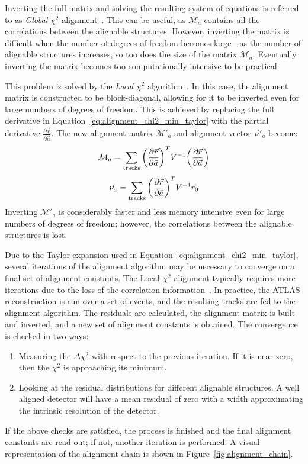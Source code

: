 Inverting the full matrix and solving the resulting system of equations is referred to as \emph{Global} $\chi^2$ alignment~\cite{2005.global-chi2-alignment}.
This can be useful, as $\mathcal{M}_a$ contains all the correlations between the alignable structures.
However, inverting the matrix is difficult when the number of degrees of freedom becomes large---as the number of alignable structures increases, so too does the size of the matrix $\mathcal{M}_a$.
Eventually inverting the matrix becomes too computationally intensive to be practical.

This problem is solved by the \emph{Local} $\chi^2$ algorithm~\cite{2005.local-chi2-thesis}.
In this case, the alignment matrix is constructed to be block-diagonal, allowing for it to be inverted even for large numbers of degrees of freedom.
This is achieved by replacing the full derivative in Equation~\ref{eq:alignment_chi2_min_taylor} with the partial derivative $\frac{\partial\vec{r}}{\partial\vec{a}}$.
The new alignment matrix $\mathcal{M}'_{a}$ and alignment vector $\vec{\nu}'_a$ become:
\begin{equation}
  \mathcal{M}_a = \sum\limits_{\textrm{tracks}}\bigg(\pderiv{\vec{r}}{\vec{a}}\bigg)^{T}V^{-1}\bigg(\pderiv{\vec{r}}{\vec{a}}\bigg)
  \label{eq:alignment_matrix_local}
\end{equation}
\begin{equation}
  \vec{\nu}_a = \sum\limits_{\textrm{tracks}}\bigg(\pderiv{\vec{r}}{\vec{a}}\bigg)^{T}V^{-1}\vec{r}_0
  \label{eq:alignment_vector_local}
\end{equation}
Inverting $\mathcal{M}'_{a}$ is considerably faster and less memory intensive even for large numbers of degrees of freedom; however, the correlations between the alignable structures is lost.

Due to the Taylor expansion used in Equation~\ref{eq:alignment_chi2_min_taylor}, several iterations of the alignment algorithm may be necessary to converge on a final set of alignment constants.
The Local $\chi^2$ alignment typically requires more iterations due to the loss of the correlation information~\cite{2007.alignment-strategy}.
In practice, the ATLAS reconstruction is run over a set of events, and the resulting tracks are fed to the alignment algorithm.
The residuals are calculated, the alignment matrix is built and inverted, and a new set of alignment constants is obtained.
The convergence is checked in two ways:
\begin{enumerate}
\item Measuring the $\Delta\chi^2$ with respect to the previous iteration. If it is near zero, then the $\chi^2$ is approaching its minimum.
\item Looking at the residual distributions for different alignable structures. A well aligned detector will have a mean residual of zero with a width approximating the intrinsic resolution of the detector.
\end{enumerate}
If the above checks are satisfied, the process is finished and the final alignment constants are read out; if not, another iteration is performed.
A visual representation of the alignment chain is shown in Figure~\ref{fig:alignment_chain}.

